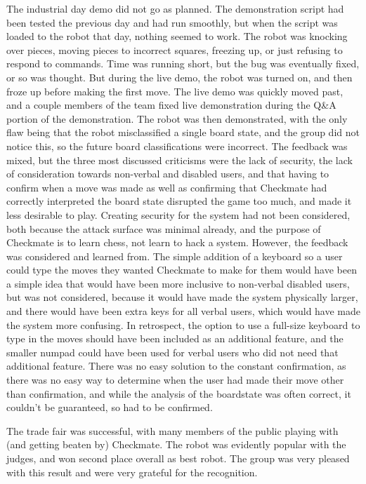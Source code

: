 \documentclass[onecolumn]{IEEEtran}
\begin{document}
The industrial day demo did not go as planned. The demonstration script had been tested the previous day and had run smoothly, but when the script was loaded to the robot that day, nothing seemed to work. The robot was knocking over pieces, moving pieces to incorrect squares, freezing up, or just refusing to respond to commands. Time was running short, but the bug was eventually fixed, or so was thought. But during the live demo, the robot was turned on, and then froze up before making the first move. The live demo was quickly moved past, and a couple members of the team fixed live demonstration during the Q\&A portion of the demonstration. The robot was then demonstrated, with the only flaw being that the robot misclassified a single board state, and the group did not notice this, so the future board classifications were incorrect. The feedback was mixed, but the three most discussed criticisms were the lack of security, the lack of consideration towards non-verbal and disabled users, and that having to confirm when a move was made as well as confirming that Checkmate had correctly interpreted the board state disrupted the game too much, and made it less desirable to play. Creating security for the system had not been considered, both because the attack surface was minimal already, and the purpose of Checkmate is to learn chess, not learn to hack a system. However, the feedback was considered and learned from. The simple addition of a keyboard so a user could type the moves they wanted Checkmate to make for them would have been a simple idea that would have been more inclusive to non-verbal disabled users, but was not considered, because it would have made the system physically larger, and there would have been extra keys for all verbal users, which would have made the system more confusing. In retrospect, the option to use a full-size keyboard to type in the moves should have been included as an additional feature, and the smaller numpad could have been used for verbal users who did not need that additional feature. There was no easy solution to the constant confirmation, as there was no easy way to determine when the user had made their move other than confirmation, and while the analysis of the boardstate was often correct, it couldn't be guaranteed, so had to be confirmed. \par
The trade fair was successful, with many members of the public playing with (and getting beaten by) Checkmate. The robot was evidently popular with the judges, and won second place overall as best robot. The group was very pleased with this result and were very grateful for the recognition. \\
\newpage
\end{document}
